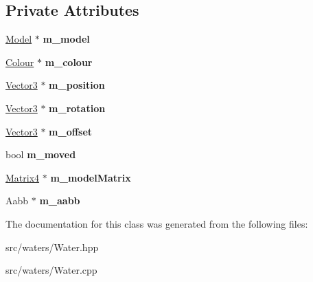 \subsection*{Private Attributes}
\begin{DoxyCompactItemize}
\item 
\mbox{\label{class_flounder_1_1_water_aea813a28c7d1531a21910ae5c3904a99}} 
\hyperlink{class_flounder_1_1_model}{Model} $\ast$ {\bfseries m\+\_\+model}
\item 
\mbox{\label{class_flounder_1_1_water_a44350481f4e3be8b666432c278b33934}} 
\hyperlink{class_flounder_1_1_colour}{Colour} $\ast$ {\bfseries m\+\_\+colour}
\item 
\mbox{\label{class_flounder_1_1_water_a00702df9651d4ee05c4ded56238d0248}} 
\hyperlink{class_flounder_1_1_vector3}{Vector3} $\ast$ {\bfseries m\+\_\+position}
\item 
\mbox{\label{class_flounder_1_1_water_a7edf81cada9afc5f011eba9c370fd53b}} 
\hyperlink{class_flounder_1_1_vector3}{Vector3} $\ast$ {\bfseries m\+\_\+rotation}
\item 
\mbox{\label{class_flounder_1_1_water_a5353a206ed8cb101764b4aab209b4578}} 
\hyperlink{class_flounder_1_1_vector3}{Vector3} $\ast$ {\bfseries m\+\_\+offset}
\item 
\mbox{\label{class_flounder_1_1_water_adff75a454e0c7c90ac4450cb59548eaf}} 
bool {\bfseries m\+\_\+moved}
\item 
\mbox{\label{class_flounder_1_1_water_ae7f65549a0e0812d4c0ee5784832f347}} 
\hyperlink{class_flounder_1_1_matrix4}{Matrix4} $\ast$ {\bfseries m\+\_\+model\+Matrix}
\item 
\mbox{\label{class_flounder_1_1_water_a0743655219c6c2672e24db7d12b32cc7}} 
Aabb $\ast$ {\bfseries m\+\_\+aabb}
\end{DoxyCompactItemize}


The documentation for this class was generated from the following files\+:\begin{DoxyCompactItemize}
\item 
src/waters/Water.\+hpp\item 
src/waters/Water.\+cpp\end{DoxyCompactItemize}
